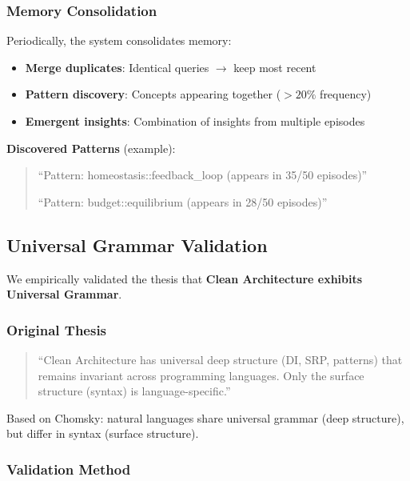 \documentclass[11pt]{article}
\begin{document}
\subsubsection{Memory Consolidation}

Periodically, the system consolidates memory:

\begin{itemize}
    \item \textbf{Merge duplicates}: Identical queries $\rightarrow$ keep most recent
    \item \textbf{Pattern discovery}: Concepts appearing together ($>20\%$ frequency)
    \item \textbf{Emergent insights}: Combination of insights from multiple episodes
\end{itemize}

\textbf{Discovered Patterns} (example):
\begin{quote}
``Pattern: homeostasis::feedback\_loop (appears in 35/50 episodes)''

``Pattern: budget::equilibrium (appears in 28/50 episodes)''
\end{quote}

\subsection{Universal Grammar Validation}

We empirically validated the thesis that \textbf{Clean Architecture exhibits Universal Grammar}.

\subsubsection{Original Thesis}

\begin{quote}
``Clean Architecture has universal deep structure (DI, SRP, patterns) that remains invariant across programming languages. Only the surface structure (syntax) is language-specific.''
\end{quote}

Based on Chomsky: natural languages share universal grammar (deep structure), but differ in syntax (surface structure).

\subsubsection{Validation Method}
\end{document}
